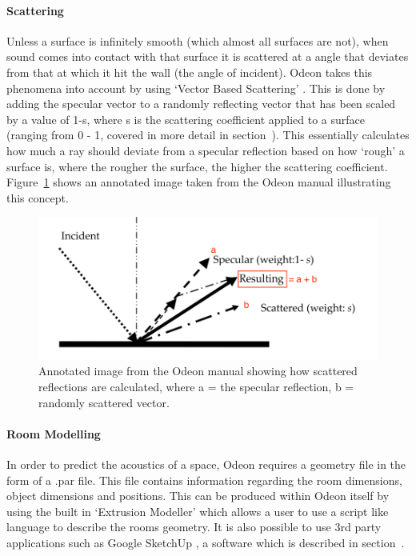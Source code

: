 \documentclass[../../main.tex]{subfiles}
\begin{document}
		\paragraph{Scattering}
		\label{background:scattering}	

			Unless a surface is infinitely smooth (which almost all surfaces are not), when sound comes into contact with that surface it is scattered at a angle that deviates from that at which it hit the wall (the angle of incident). Odeon takes this phenomena into account by using `Vector Based Scattering' \cite{odeonManual}. This is done by adding the specular vector to a randomly reflecting vector that has been scaled by a value of 1-s, where s is the scattering coefficient applied to a surface (ranging from 0 - 1, covered in more detail in section~). This essentially calculates how much a ray should deviate from a specular reflection based on how `rough' a surface is, where the rougher the surface, the higher the scattering coefficient. Figure~\ref{odeonScatterImage} shows an annotated image taken from the Odeon manual illustrating this concept.


			\begin{figure}[H]
				\center\includegraphics[scale = 1]{Sections/Background/images/scattering_edit.png}
				\caption{Annotated image from the Odeon manual \cite{odeonManual} showing how scattered reflections are calculated, where a = the specular reflection, b = randomly scattered vector.}
				\label{odeonScatterImage}
			\end{figure}

		\paragraph{Room Modelling}

			In order to predict the acoustics of a space, Odeon requires a geometry file in the form of a .par file. This file contains information regarding the room dimensions, object dimensions and positions. This can be produced within Odeon itself by using the built in `Extrusion Modeller' which allows a user to use a script like language to describe the rooms geometry. It is also possible to use 3rd party applications such as Google SketchUp \cite{SKU}, a software which is described in section~.
\end{document}
